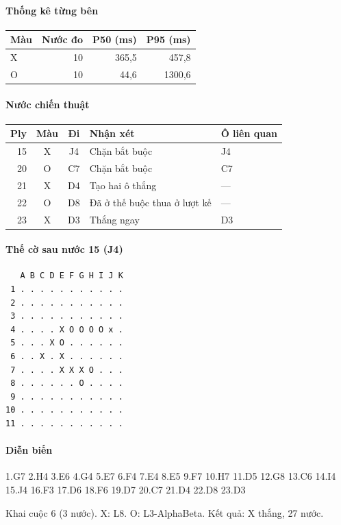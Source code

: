 \paragraph{Thống kê từng bên}
\begin{center}\small
\begin{tabular}{@{}lrrr@{}}
\toprule
Màu & Nước đo & P50 (ms) & P95 (ms) \\
\midrule
X & 10 & 365,5 & 457,8 \\
O & 10 & 44,6 & 1300,6 \\
\bottomrule
\end{tabular}
\end{center}
\paragraph{Nước chiến thuật}
\begin{center}\small
\begin{tabular}{@{}rccll@{}}
\toprule
Ply & Màu & Đi & Nhận xét & Ô liên quan \\
\midrule
15 & X & J4 & Chặn bắt buộc & J4 \\
20 & O & C7 & Chặn bắt buộc & C7 \\
21 & X & D4 & Tạo hai ô thắng & — \\
22 & O & D8 & Đã ở thế buộc thua ở lượt kế & — \\
23 & X & D3 & Thắng ngay & D3 \\
\bottomrule
\end{tabular}
\end{center}
\paragraph{Thế cờ sau nước 15 (J4)}
\begin{verbatim}
   A B C D E F G H I J K
 1 . . . . . . . . . . .
 2 . . . . . . . . . . .
 3 . . . . . . . . . . .
 4 . . . . X O O O O x .
 5 . . . X O . . . . . .
 6 . . X . X . . . . . .
 7 . . . . X X X O . . .
 8 . . . . . . O . . . .
 9 . . . . . . . . . . .
10 . . . . . . . . . . .
11 . . . . . . . . . . .
\end{verbatim}
\paragraph{Diễn biến}
{\footnotesize 1.G7 2.H4 3.E6 4.G4 5.E7 6.F4 7.E4 8.E5 9.F7 10.H7 11.D5 12.G8 13.C6 14.I4 15.J4 16.F3 17.D6 18.F6 19.D7 20.C7 21.D4 22.D8 23.D3\par}
Khai cuộc 6 (3 nước). X: L8. O: L3-AlphaBeta. Kết quả: X thắng, 27 nước.
